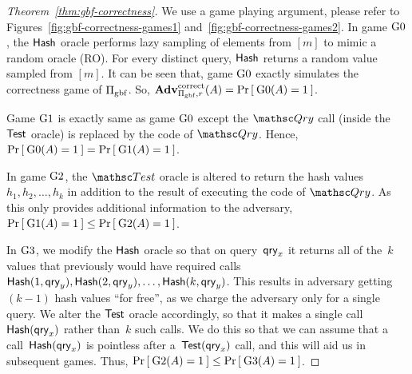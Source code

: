 \begin{proof}[Theorem~\ref{thm:gbf-correctness}]
We use a game playing argument, please refer to Figures~\ref{fig:gbf-correctness-games1} and~\ref{fig:gbf-correctness-games2}. In game $\text{G0}$, the $\mathsf{Hash}$ oracle performs lazy sampling of elements from $[m]$ to mimic a random oracle (RO). For every distinct query, $\mathsf{Hash}$ returns a random value sampled from $[m]$. It can be seen that, game $\text{G0}$ exactly simulates the correctness game of $\Pi_{\mathrm{gbf}}$.  So, $\mathrm{\mathbf{Adv}}^{\mathrm{correct}}_{\Pi_{\mathrm{gbf}},r}(A) = \Pr\left[\: \text{G0}(A) = 1 \:\right]$.

Game $\text{G1}$ is exactly same as game $\text{G0}$ except the $\Qry$ call (inside the $\mathsf{Test}$ oracle) is replaced by the code of $\Qry$.  Hence, $\Pr\left[\: \text{G0}(A) = 1 \:\right] = \Pr\left[\: \text{G1}(A) = 1 \:\right]$.

In game $\text{G2}$, the $\Test$ oracle is altered to return the hash values~$h_1,h_2,\ldots, h_k$ in addition to the result of executing the code of $\Qry$.  As this only provides additional information to the adversary, $\Pr\left[\: \text{G1}(A) = 1 \:\right] \leq \Pr\left[\: \text{G2}(A) = 1 \:\right]$.

In $\text{G3}$, we modify the $\mathsf{Hash}$ oracle so that on query~$\mathsf{qry}_x$ it returns all of the~$k$ values that previously would have required calls $\HashOracle(1,\qry_y),\HashOracle(2,\qry_y),\ldots,\linebreak\HashOracle(k,\qry_y)$.  This results in adversary getting $(k-1)$ hash values ``for free'', as we charge the adversary only for a single query.  We alter the $\mathsf{Test}$ oracle accordingly, so that it makes a single call $\mathsf{Hash}(\mathsf{qry}_x)$ rather than~$k$ such calls.  
We do this so that we can assume that a call~$\mathsf{Hash}(\mathsf{qry}_x)$ is pointless after a~$\mathsf{Test}(\mathsf{qry}_x)$ call, and this will aid us in subsequent games.    Thus, $\Pr\left[\: \text{G2}(A) = 1 \:\right] \leq \Pr\left[\: \text{G3}(A) = 1 \:\right]$. 


\end{proof}
